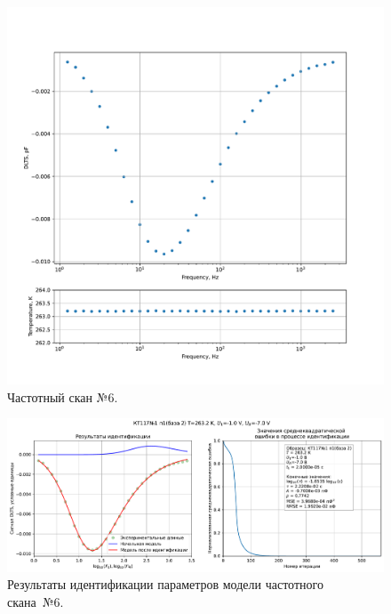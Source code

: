 \begin{figure}[!ht]
    \centering
    \includegraphics[width=1\textwidth]{../plots/КТ117№1_п1(база 2)_2500Гц-1Гц_1пФ_-10С_-1В-7В_200мВ_20мкс_шаг_0,1.pdf}
    \caption{Частотный скан №6.}
    \label{pic:frequency_scan_6}
\end{figure}

\begin{figure}[!ht]
    \centering
    \includegraphics[width=1\textwidth]{../plots/КТ117№1_п1(база 2)_2500Гц-1Гц_1пФ_-10С_-1В-7В_200мВ_20мкс_шаг_0,1_model.pdf}
    \caption{Результаты идентификации параметров модели частотного скана~№6.}
    \label{pic:frequency_scan_model6}
\end{figure}

\pagebreak


